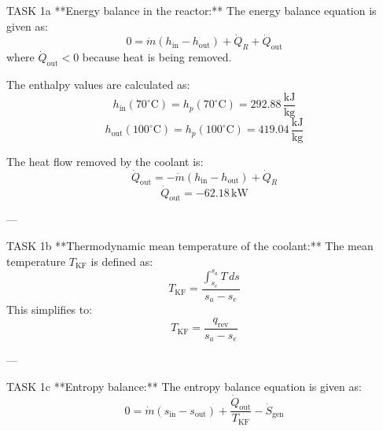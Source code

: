 TASK 1a  
**Energy balance in the reactor:**  
The energy balance equation is given as:  
\[
0 = \dot{m} \left( h_{\text{in}} - h_{\text{out}} \right) + \dot{Q}_R + \dot{Q}_{\text{out}}
\]  
where \( \dot{Q}_{\text{out}} < 0 \) because heat is being removed.  

The enthalpy values are calculated as:  
\[
h_{\text{in}}(70^\circ\text{C}) = h_p(70^\circ\text{C}) = 292.88 \, \frac{\text{kJ}}{\text{kg}}
\]  
\[
h_{\text{out}}(100^\circ\text{C}) = h_p(100^\circ\text{C}) = 419.04 \, \frac{\text{kJ}}{\text{kg}}
\]  

The heat flow removed by the coolant is:  
\[
\dot{Q}_{\text{out}} = -\dot{m} \left( h_{\text{in}} - h_{\text{out}} \right) + \dot{Q}_R
\]  
\[
\dot{Q}_{\text{out}} = -62.18 \, \text{kW}
\]  

---

TASK 1b  
**Thermodynamic mean temperature of the coolant:**  
The mean temperature \( T_{\text{KF}} \) is defined as:  
\[
T_{\text{KF}} = \frac{\int_{s_e}^{s_a} T \, ds}{s_a - s_e}
\]  
This simplifies to:  
\[
T_{\text{KF}} = \frac{q_{\text{rev}}}{s_a - s_e}
\]  

---

TASK 1c  
**Entropy balance:**  
The entropy balance equation is given as:  
\[
0 = \dot{m} \left( s_{\text{in}} - s_{\text{out}} \right) + \frac{\dot{Q}_{\text{out}}}{T_{\text{KF}}} - \dot{S}_{\text{gen}}
\]  